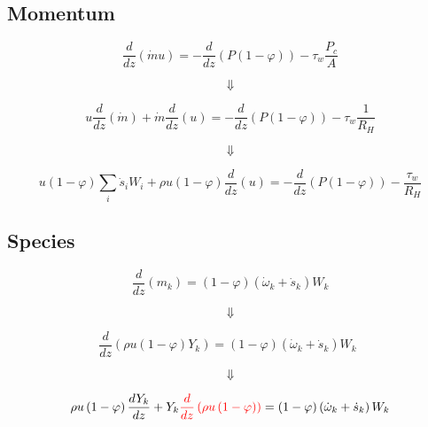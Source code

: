 \subsection{Momentum}

\begin{equation*}
	\frac{d}{dz}(\dot{m}u) = -\frac{d}{dz}(P(1-\varphi))
	-\tau_w \frac{P_c}{A}
\end{equation*}

\begin{equation*}
	\Downarrow
\end{equation*}

\begin{equation*}
	u\frac{d}{dz}(\dot{m}) + \dot{m}\frac{d}{dz}(u)= -\frac{d}{dz}(P(1-\varphi))
	-\tau_w \frac{1}{R_H}
\end{equation*}

\begin{equation*}
	\Downarrow
\end{equation*}

\begin{equation}
	u(1-\varphi)\sum_{i}{{\dot{s}}_iW_i} + \rho u(1-\varphi)\frac{d}{dz}(u)= -\frac{d}{dz}(P(1-\varphi))
	-\frac{\tau_w}{R_H}
\end{equation}

\subsection{Species}

\begin{equation*}
	\frac{d}{dz}\left(m_k\right)=\left(1-\varphi\right)\left({\dot{\omega}}_k+{\dot{s}}_k\right)W_k
\end{equation*}

\begin{equation*}
	\Downarrow
\end{equation*}

\begin{equation*}
	\frac{d}{dz}\left(\rho u(1-\varphi)Y_k\right)=\left(1-\varphi\right)\left({\dot{\omega}}_k+{\dot{s}}_k\right)W_k\ \ 
\end{equation*}

\begin{equation*}
	\Downarrow
\end{equation*}

\begin{equation*}
	\rho u\left(1-\varphi\right)\frac{dY_k}{dz}
	+
	Y_k
	\color{red}
	\frac{d}{dz}\left(\rho u\left(1-\varphi\right)\right)
	\color{black}
	=
	\left(1-\varphi\right)\left({\dot{\omega}}_k+{\dot{s}}_k\right)W_k
\end{equation*}

